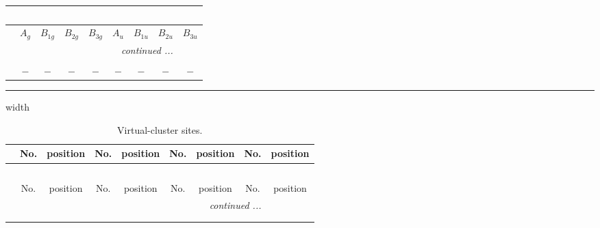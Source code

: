 \documentclass[fleqn,10pt,landscape]{article}
\begin{document}
\begin{itemize}
\begin{center}
\begin{longtable}{ccccccccc}
\multicolumn{8}{l}{\tablename\ \thetable{}} \\
 \hline \hline
 & $ A_{g} $ & $ B_{1g} $ & $ B_{2g} $ & $ B_{3g} $ & $ A_{u} $ & $ B_{1u} $ & $ B_{2u} $ & $ B_{3u} $ \\ \hline \endhead

 \hline \hline
\multicolumn{8}{r}{\footnotesize\it continued ...} \\ \endfoot

 \hline \hline
\multicolumn{8}{r}{} \\ \endlastfoot

$  $ & $ - $ & $ - $ & $ - $ & $ - $ & $ - $ & $ - $ & $ - $ & $ - $ \\
\end{longtable}
\end{center}

 \hfil \hrule height 1mm width \textwidth \hfil

{
\scriptsize
\begin{center}
\renewcommand{\arraystretch}{1.7}
\begin{longtable}{ccccccccc}
\caption{Virtual-cluster sites.}
 \\
 \hline \hline
 & No. & position & No. & position & No. & position & No. & position \\ \hline \endfirsthead

\multicolumn{8}{l}{\tablename\ \thetable{}} \\
 \hline \hline
 & No. & position & No. & position & No. & position & No. & position \\ \hline \endhead

 \hline \hline
\multicolumn{8}{r}{\footnotesize\it continued ...} \\ \endfoot

 \hline \hline
\multicolumn{8}{r}{} \\ \endlastfoot


\end{longtable}
\end{center}}
\end{itemize}
\end{document}
